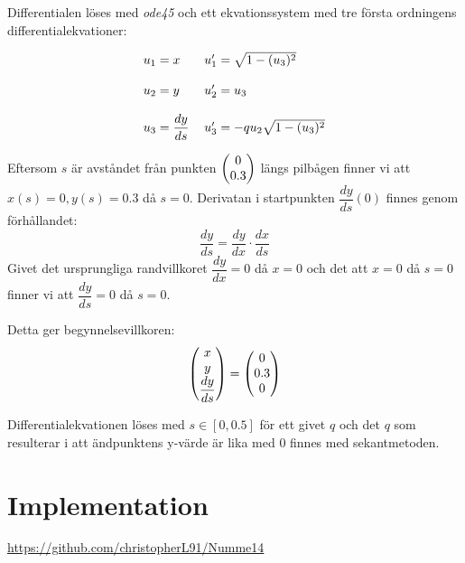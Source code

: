 \documentclass[a4paper,11pt,twoside]{article}
\newcommand*\colvec[3][]{
    \begin{pmatrix}\ifx\relax#1\relax\else#1\\\fi#2\\#3\end{pmatrix}
}
\begin{document}
Differentialen löses med \textit{ode45} och ett ekvationssystem med tre första ordningens differentialekvationer:

\begin{align}
\begin{tabular}{ l l }
	$u_1 = x$ 					& $u_1' = \sqrt{1-(u_3)^2}$\\
	& \\
	$u_2 = y$ 					& $u_2' = u_3$\\
	& \\
	$u_3 = \dfrac{dy}{ds}$ 		& $u_3' = -qu_2\sqrt{1-(u_3)^2}$
\end{tabular}
\nonumber
\end{align}

Eftersom $s$ är avståndet från punkten $\colvec{0}{0.3}$ längs pilbågen finner vi att $x(s)=0, y(s)=0.3$ då $s=0$. Derivatan i startpunkten $\dfrac{dy}{ds}(0)$ finnes genom förhållandet:
\begin{equation}
\dfrac{dy}{ds}=\dfrac{dy}{dx}\cdotp\dfrac{dx}{ds} \nonumber
\end{equation}
Givet det ursprungliga randvillkoret $\dfrac{dy}{dx}=0$ då $x=0$ och det att $x=0$ då $s=0$ finner vi att $\dfrac{dy}{ds}=0$ då $s=0$.

Detta ger begynnelsevillkoren:
\begin{equation}
\colvec[x]{y}{\dfrac{dy}{ds}}=\colvec[0]{0.3}{0} \nonumber
\end{equation}

Differentialekvationen löses med $s \in [0,0.5]$ för ett givet $q$ och det $q$ som resulterar i att ändpunktens y-värde är lika med $0$ finnes med sekantmetoden.

\section{Implementation}
\href{https://github.com/christopherL91/Numme14}{https://github.com/christopherL91/Numme14}
\end{document}
